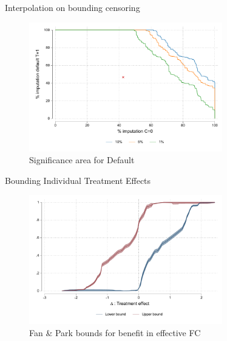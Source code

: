 \documentclass[8pt]{beamer}
\begin{document}
\begin{frame}{Interpolation on bounding censoring}
    
\begin{figure}[H]
        \caption{Significance area for Default}
    \label{interpolation_censoring_imp}
    \begin{center}
        \includegraphics[width=0.75\textwidth]{Figuras/frontera_sig_def_imp.pdf}
    \end{center}
\end{figure}
\end{frame}


\begin{frame}{Bounding Individual Treatment Effects}
\label{fan_park_bounds}    

\begin{figure}[H]
    \caption{Fan \& Park bounds for benefit in effective FC }
    
    \begin{center}
        \includegraphics[width=0.75\textwidth]{Figuras/fan_park_bounds_fc_admin.pdf}
    \end{center}
   
\end{figure}
 \hyperlink{choice_hte}{}
\end{frame}
\end{document}
